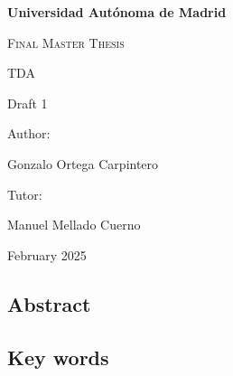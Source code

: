 \documentclass[12pt, a4paper]{article}
\theoremstyle{definition}
\newcommand{\authorname}{Gonzalo Ortega Carpintero}
\newcommand{\tutorname}{Manuel Mellado Cuerno}
\newcommand{\institution}{Universidad Autónoma de Madrid}
\newcommand{\projecttitle}{TDA

Draft 1}
\begin{document}
\begin{titlepage}
    \centering
    \vspace{1cm}
    {\bfseries\LARGE \institution \par}
    \vspace{1cm}
    {\scshape\Large Final Master Thesis \par}
    \vspace{3cm}
    {\scshape\Huge \projecttitle \par}
    \vspace{2cm}
    \vfill
    {\Large Author: \par}
    {\Large \authorname \par}
    \vspace{1cm}
    {\Large Tutor: \par}
    {\Large \tutorname \par}
    \vfill
    {\Large February 2025 \par}
\end{titlepage}


\setlength{\parskip}{0.75em}
\renewcommand{\baselinestretch}{1.25}


\subsection*{Abstract}

\subsection*{Key words}

\tableofcontents
\pagebreak


\pagebreak



\end{document}
